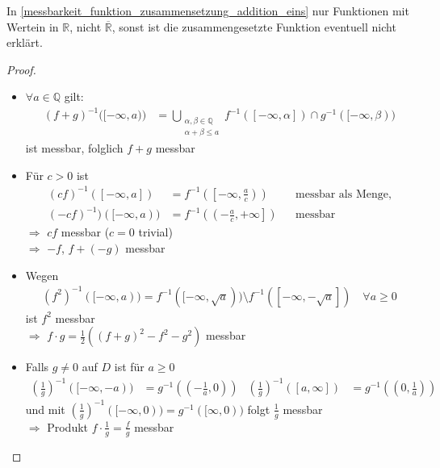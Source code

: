 \begin{underlinedenvironment}[Hinweis]
	In \ref{messbarkeit_funktion_zusammensetzung_addition_eins} nur Funktionen mit Wertein in $\mathbb{R}$, nicht $\overline{\mathbb{R}}$, sonst ist die zusammengesetzte Funktion eventuell nicht erklärt.
\end{underlinedenvironment}

\begin{proof}\hspace*{0pt}
	\NoEndMark
	\begin{itemize}
	\item $\forall a\in\mathbb{Q}$ gilt: \begin{align*}
		\left( f + g\right)^{-1}\big( [-\infty, a) \big) &= \bigcup\limits_{\substack{\alpha,\beta\in\mathbb{Q}\\ \alpha + \beta \le a}} f^ {-1} ([-\infty,\alpha])\cap g^{-1}([-\infty,\beta))
	\end{align*}
	ist messbar, folglich $f+g$ messbar
	
	\item Für $c > 0$ ist \begin{align*}
		(cf)^{-1}([-\infty, a]) &= f^{-1} \left(\left[ -\infty,\frac{a}{c}\right)\right)&&\text{messbar als Menge,} \\
		(-cf)^{-1}) ([-\infty,a)) &= f^{-1}\left( \left(-\frac{a}{c},+\infty \right]\right)&&\text{messbar}
	\end{align*}
	$\Rightarrow$ $cf$ messbar ($c=0$ trivial) \\
	$\Rightarrow$ $-f$, $f+(-g)$ messbar
	
	\item Wegen \begin{align*}\left(f^2\right)^{-1}([-\infty,a)) = f^{-1}([-\infty,\sqrt{a}))\setminus f^{-1}([-\infty,-\sqrt{a}])\quad \forall a\ge 0\end{align*} ist $f^2$ messbar \\
	$\Rightarrow$ $f\cdot g = \frac{1}{2}\left( (f+g)^2 - f^2 - g^2\right)$ messbar
	
	\item Falls $g\neq 0$ auf $D$ ist für $a\ge 0$ \begin{align*}
		\left( \frac{1}{g}\right)^{-1} ([-\infty, -a)) &= g^{-1}\left( \left( -\frac{1}{a}, 0\right)\right) & \left( \frac{1}{g}\right)^{-1} ([a,\infty]) &= g^{-1} \left( \left( 0,\frac{1}{a}\right) \right)
	\end{align*}
	und mit $\left( \frac{1}{g}\right)^{-1}([-\infty,0)) = g^{-1}([\infty, 0))$ folgt $\frac{1}{g}$ messbar \\
	$\Rightarrow$ Produkt $f\cdot \frac{1}{g} = \frac{f}{g}$ messbar
	

\end{itemize}
\end{proof}
